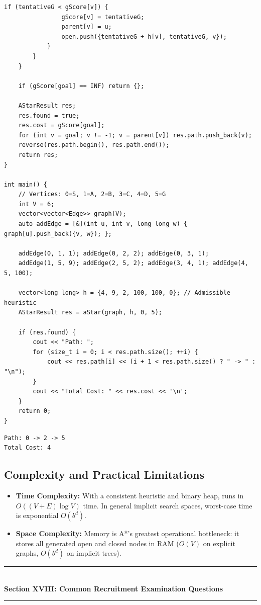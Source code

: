 \begin{lstlisting}[style=cppstyle, caption={C++ A* Search Algorithm on Weighted Graph.}]
            if (tentativeG < gScore[v]) {
                gScore[v] = tentativeG;
                parent[v] = u;
                open.push({tentativeG + h[v], tentativeG, v});
            }
        }
    }

    if (gScore[goal] == INF) return {};

    AStarResult res;
    res.found = true;
    res.cost = gScore[goal];
    for (int v = goal; v != -1; v = parent[v]) res.path.push_back(v);
    reverse(res.path.begin(), res.path.end());
    return res;
}

int main() {
    // Vertices: 0=S, 1=A, 2=B, 3=C, 4=D, 5=G
    int V = 6;
    vector<vector<Edge>> graph(V);
    auto addEdge = [&](int u, int v, long long w) { graph[u].push_back({v, w}); };

    addEdge(0, 1, 1); addEdge(0, 2, 2); addEdge(0, 3, 1);
    addEdge(1, 5, 9); addEdge(2, 5, 2); addEdge(3, 4, 1); addEdge(4, 5, 100);

    vector<long long> h = {4, 9, 2, 100, 100, 0}; // Admissible heuristic
    AStarResult res = aStar(graph, h, 0, 5);

    if (res.found) {
        cout << "Path: ";
        for (size_t i = 0; i < res.path.size(); ++i) {
            cout << res.path[i] << (i + 1 < res.path.size() ? " -> " : "\n");
        }
        cout << "Total Cost: " << res.cost << '\n';
    }
    return 0;
}
\end{lstlisting}

\begin{lstlisting}[style=pseudocode, caption={Execution Output}]
Path: 0 -> 2 -> 5
Total Cost: 4
\end{lstlisting}

\subsection{Complexity and Practical Limitations}
\begin{itemize}
    \item \textbf{Time Complexity:} With a consistent heuristic and binary heap, runs in $O((V + E) \log V)$ time. In general implicit search spaces, worst-case time is exponential $O(b^d)$.
    \item \textbf{Space Complexity:} Memory is A*'s greatest operational bottleneck: it stores all generated open and closed nodes in RAM ($O(V)$ on explicit graphs, $O(b^d)$ on implicit trees).
\end{itemize}

\newpage
\begin{center}
\vspace{0.5em}
{\color{primary}\rule{0.45\textwidth}{1.2pt}}\\[4pt]
{\Large\bfseries\color{primary} Section XVIII: Common Recruitment Examination Questions}\\[2pt]
{\color{primary}\rule{0.45\textwidth}{1.2pt}}
\vspace{0.5em}
\end{center}

